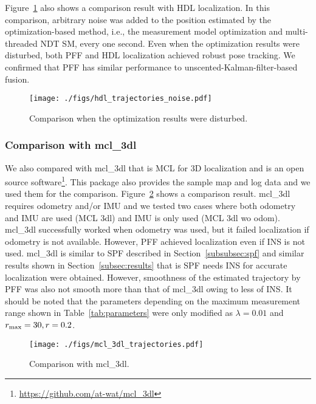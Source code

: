 \documentclass[letterpaper, 10 pt, conference]{ieeeconf}  %
\begin{document}
Figure~\ref{fig:hdl_trajectories_noise} also shows a comparison result with HDL localization.
In this comparison, arbitrary noise was added to the position estimated by the optimization-based method, i.e., the measurement model optimization and multi-threaded NDT SM, every one second.
Even when the optimization results were disturbed, both PFF and HDL localization achieved robust pose tracking.
We confirmed that PFF has similar performance to unscented-Kalman-filter-based fusion.

\begin{figure}[!t]
    \begin{center}
        \texttt{[image: ./figs/hdl\_trajectories\_noise.pdf]}
        \caption{Comparison when the optimization results were disturbed.}
        \label{fig:hdl_trajectories_noise}
    \end{center}
\end{figure}



\subsubsection{Comparison with mcl\_3dl}

We also compared with mcl\_3dl that is MCL for 3D localization and is an open source software\footnote{\url{https://github.com/at-wat/mcl_3dl}}.
This package also provides the sample map and log data and we used them for the comparison.
Figure~\ref{fig:mcl_3dl_trajectories} shows a comparison result.
mcl\_3dl requires odometry and/or IMU and we tested two cases where both odometry and IMU are used (MCL 3dl) and IMU is only used (MCL 3dl wo odom).
mcl\_3dl successfully worked when odometry was used, but it failed localization if odometry is not available.
However, PFF achieved localization even if INS is not used.
mcl\_3dl is similar to SPF described in Section~\ref{subsubsec:spf} and similar results shown in Section~\ref{subsec:results} that is SPF needs INS for accurate localization were obtained.
However, smoothness of the estimated trajectory by PFF was also not smooth more than that of mcl\_3dl owing to less of INS.
It should be noted that the parameters depending on the maximum measurement range shown in Table~\ref{tab:parameters} were only modified as $\lambda = 0.01$ and $r_{{\rm max}} = 30, r = 0.2$.

\begin{figure}[!t]
    \begin{center}
        \texttt{[image: ./figs/mcl\_3dl\_trajectories.pdf]}
        \caption{Comparison with mcl\_3dl.}
        \label{fig:mcl_3dl_trajectories}
    \end{center}
\end{figure}
\end{document}
